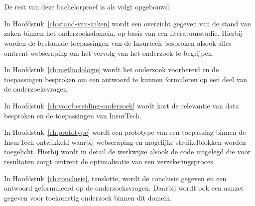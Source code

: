 \section{}
\label{sec:opzet-bachelorproef}


De rest van deze bachelorproef is als volgt opgebouwd:

In Hoofdstuk~\ref{ch:stand-van-zaken} wordt een overzicht gegeven van de stand van zaken binnen het onderzoeksdomein, op basis van een literatuurstudie. Hierbij worden de bestaande toepassingen van de Insurtech besproken alsook alles omtrent webscraping om het vervolg van het onderzoek te begrijpen.

In Hoofdstuk~\ref{ch:methodologie} wordt het onderzoek voorbereid en de toepassingen besproken om een antwoord te kunnen formuleren op een deel van de onderzoeksvragen.

In Hoofdstuk~\ref{ch:voorbereiding-onderzoek} wordt kort de relevantie van data besproken en de toepassingen van InsurTech.

In Hoofdstuk~\ref{ch:prototype} wordt een prototype van een toepassing binnen de InsurTech ontwikkeld waarbij webscraping en mogelijke struikelblokken worden toegelicht. Hierbij wordt in detail de werkwijze alsook de code uitgelegd die voor resultaten zorgt omtrent de optimalisatie van een verzekeringsproces.

In Hoofdstuk~\ref{ch:conclusie}, tenslotte, wordt de conclusie gegeven en een antwoord geformuleerd op de onderzoeksvragen. Daarbij wordt ook een aanzet gegeven voor toekomstig onderzoek binnen dit domein.